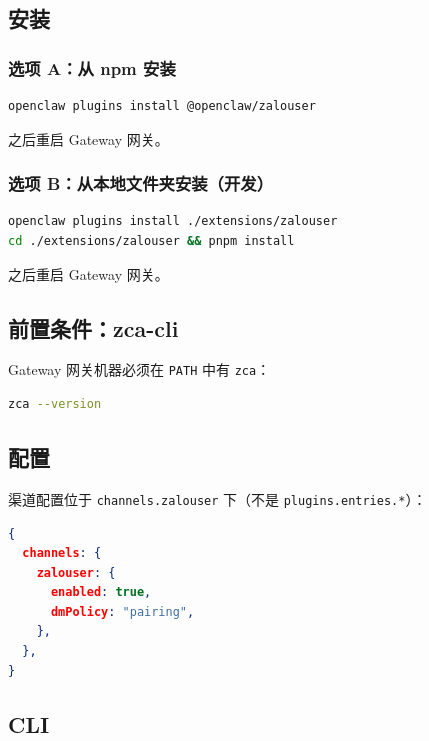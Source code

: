 \subsection{安装}


\subsubsection{选项 A：从 npm 安装}


\begin{lstlisting}[language=bash]
openclaw plugins install @openclaw/zalouser
\end{lstlisting}


之后重启 Gateway 网关。

\subsubsection{选项 B：从本地文件夹安装（开发）}


\begin{lstlisting}[language=bash]
openclaw plugins install ./extensions/zalouser
cd ./extensions/zalouser && pnpm install
\end{lstlisting}


之后重启 Gateway 网关。

\subsection{前置条件：zca-cli}


Gateway 网关机器必须在 \texttt{PATH} 中有 \texttt{zca}：

\begin{lstlisting}[language=bash]
zca --version
\end{lstlisting}


\subsection{配置}


渠道配置位于 \texttt{channels.zalouser} 下（不是 \texttt{plugins.entries.*}）：

\begin{lstlisting}[language=json]
{
  channels: {
    zalouser: {
      enabled: true,
      dmPolicy: "pairing",
    },
  },
}
\end{lstlisting}


\subsection{CLI}



